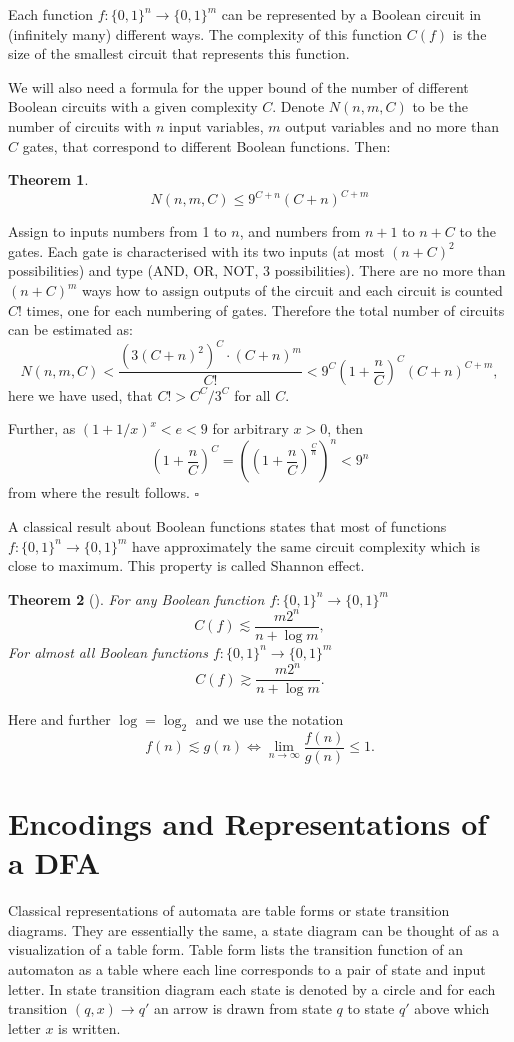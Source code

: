 \documentclass[copyright, creativecommons]{eptcs}
\newcommand{\qed}{$\square$}
\newtheorem{theorem}{Theorem}[section]
\newenvironment{proof}[1][Proof]{\begin{trivlist}
\item[\hskip \labelsep {\bfseries #1}]}{\end{trivlist}}
\begin{document}
Each function $f:\{0, 1\}^n\rightarrow\{0, 1\}^m$ can be represented by a Boolean circuit in (infinitely many) different ways.
The complexity of this function $C(f)$ is the size of the smallest circuit that represents this function.

We will also need a formula for the upper bound of the number of different Boolean circuits with a given complexity $C$.
Denote $N(n, m, C)$ to be the number of circuits with $n$ input variables,
$m$ output variables and no more than $C$ gates, that correspond to different Boolean
functions. Then:
\begin{theorem}
\label{shemuSkaits}
$$N(n, m, C)\leq 9^{C+n}(C+n)^{C+m}$$
\end{theorem}
\begin{proof}
Assign to inputs numbers from 1 to $n$, and numbers from $n+1$ to $n+C$ to the gates. Each gate is characterised
with its two inputs (at most $(n+C)^2$ possibilities) and type (AND, OR, NOT, 3 possibilities). There are no more
than $(n+C)^m$ ways how to assign outputs of the circuit and each circuit is counted $C!$ times, one for each
numbering of gates. Therefore the total number of circuits can be estimated as:
$$N(n, m, C)<\frac{(3(C+n)^2)^C\cdot (C+n)^m}{C!}<9^C(1+\frac{n}{C})^C(C+n)^{C+m},$$
here we have used, that $C!>C^C/3^C$ for all $C$.

Further, as $(1+1/x)^x<e<9$ for arbitrary $x>0$, then
$$(1+\frac{n}{C})^C=((1+\frac{n}{C})^\frac{C}{n})^n<9^n$$
from where the result follows.
\qed
\end{proof}

A classical result about Boolean functions states that most of functions $f:\{0, 1\}^n\rightarrow\{0, 1\}^m$ have
approximately the same circuit complexity which is close to maximum. This property is called Shannon effect.
\begin{theorem}[\cite{L84}]
\label{ShTeorema}
For any Boolean function $f:\{0, 1\}^n\rightarrow \{0, 1\}^m$
$$C(f)\lesssim \frac{m2^n}{n+\log m},$$
For almost all  Boolean functions $f:\{0, 1\}^n\rightarrow \{0, 1\}^m$
$$C(f)\gtrsim \frac{m2^n}{n+\log m}.$$
\end{theorem}
Here and further $\log=\log_2$ and we use the notation
$$f(n)\lesssim g(n) \Leftrightarrow \lim_{n\rightarrow \infty}\frac{f(n)}{g(n)}\leq 1.$$











\section{Encodings and Representations of a DFA}
\label{3nod}
Classical representations of automata are table forms or state transition diagrams. They are essentially
the same, a state diagram can be thought of as a visualization of a table form. Table form lists
the transition function of an automaton as a table where each line corresponds to a pair of state and input letter.
In state transition diagram each state is denoted by a circle and for each
transition $(q,x)\rightarrow q'$ an arrow is drawn from state $q$ to state $q'$ above which letter $x$ is written.
\end{document}
